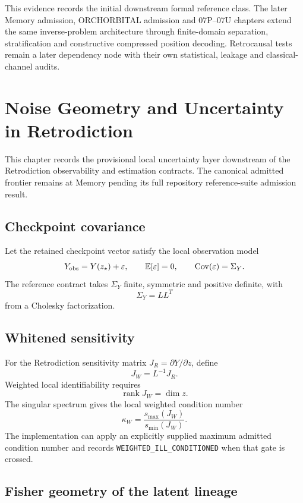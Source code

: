 \documentclass[11pt]{book}
\begin{document}
This evidence records the initial downstream formal reference class. The later Memory admission, ORCHORBITAL admission and 07P--07U chapters extend the same inverse-problem architecture through finite-domain separation, stratification and constructive compressed position decoding. Retrocausal tests remain a later dependency node with their own statistical, leakage and classical-channel audits.

\chapter{Noise Geometry and Uncertainty in Retrodiction}

This chapter records the provisional local uncertainty layer downstream of the Retrodiction observability and estimation contracts. The canonical admitted frontier remains at Memory pending its full repository reference-suite admission result.

\section{Checkpoint covariance}

Let the retained checkpoint vector satisfy the local observation model
\[
Y_{\rm obs}=Y(z_\star)+\varepsilon,
\qquad
\mathbb E[\varepsilon]=0,
\qquad
\operatorname{Cov}(\varepsilon)=\Sigma_Y.
\]
The reference contract takes \(\Sigma_Y\) finite, symmetric and positive definite, with
\[
\boxed{\Sigma_Y=LL^T}
\]
from a Cholesky factorization.

\section{Whitened sensitivity}

For the Retrodiction sensitivity matrix \(J_R=\partial Y/\partial z\), define
\[
\boxed{J_W=L^{-1}J_R.}
\]
Weighted local identifiability requires
\[
\boxed{\operatorname{rank}J_W=\dim z.}
\]
The singular spectrum gives the local weighted condition number
\[
\boxed{
\kappa_W=\frac{s_{\max}(J_W)}{s_{\min}(J_W)}.
}
\]
The implementation can apply an explicitly supplied maximum admitted condition number and records \texttt{WEIGHTED\_ILL\_CONDITIONED} when that gate is crossed.

\section{Fisher geometry of the latent lineage}
\end{document}

